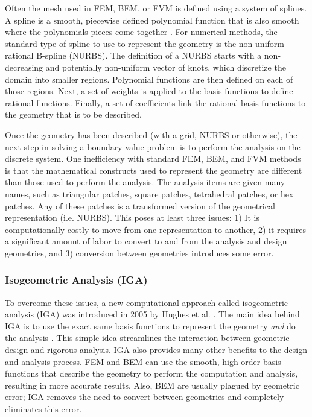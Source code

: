       Often the mesh used in FEM, BEM, or FVM is defined using a system of splines. A spline is a smooth, piecewise defined polynomial function that is also smooth where the polynomials pieces come together \cite{judd1998}.
      For numerical methods, the standard type of spline to use to represent the geometry is the non-uniform rational B-spline (NURBS). The definition of a NURBS starts with a non-decreasing and potentially non-uniform vector of knots, which discretize the domain into smaller regions. Polynomial functions are then defined on each of those regions. Next, a set of weights is applied to the basis functions to define rational functions. Finally, a set of coefficients link the rational basis functions to the geometry that is to be described.

      Once the geometry has been described (with a grid, NURBS or otherwise), the next step in solving a boundary value problem is to perform the analysis on the discrete system. One inefficiency with standard FEM, BEM, and FVM methods is that the mathematical constructs used to represent the geometry are different than those used to perform the analysis. The analysis items are given many names, such as triangular patches, square patches, tetrahedral patches, or hex patches. Any of these patches is a transformed version of the geometrical representation (i.e. NURBS). This poses at least three issues: 1) It is computationally costly to move from one representation to another, 2) it requires a significant amount of labor to convert to and from the analysis and design geometries, and 3) conversion between geometries introduces some error.

    \subsubsection{Isogeometric Analysis (IGA)} \label{ssub:isogeometric_analysis_iga}

      To overcome these issues, a new computational approach called isogeometric analysis (IGA) was introduced in 2005 by Hughes et al. \cite{hughes2005}. The main idea behind IGA is to use the exact same basis functions to represent the geometry \textit{and} do the analysis \cite{scott2013}. This simple idea streamlines the interaction between geometric design and rigorous analysis. IGA also provides many other benefits to the design and analysis process. FEM and BEM can use the smooth, high-order basis functions that describe the geometry to perform the computation and analysis, resulting in more accurate results. Also, BEM are usually plagued by geometric error; IGA removes the need to convert between geometries and completely eliminates this error.

